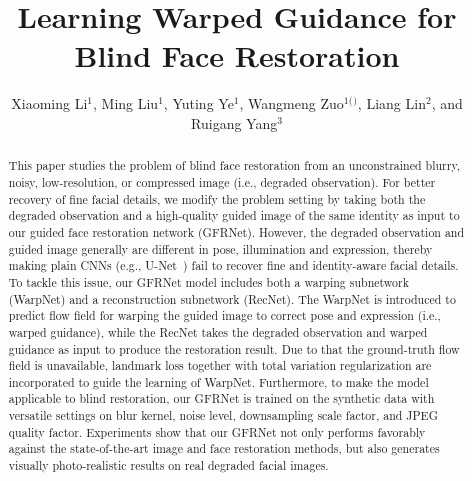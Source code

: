 \documentclass[runningheads]{llncs}
\begin{document}
\pagestyle{headings}
\mainmatter
\def\ECCV18SubNumber{399}  

\title{Learning Warped Guidance for Blind Face Restoration} 

\titlerunning{}

\author{Xiaoming Li$^1$, Ming Liu$^1$, Yuting Ye$^1$, Wangmeng Zuo$^{1(}$\Envelope$^)$, Liang Lin$^2$, \newline and Ruigang Yang$^3$}
\maketitle
\begin{abstract}
This paper studies the problem of blind face restoration from an unconstrained blurry, noisy, low-resolution, or compressed image (i.e., degraded observation).
For better recovery of fine facial details, we modify the problem setting by taking both the degraded observation and a high-quality guided image of the same identity as input to our guided face restoration network (GFRNet).
However, the degraded observation and guided image generally are different in pose, illumination and expression, thereby making plain CNNs (e.g., U-Net~\cite{ronneberger2015u}) fail to recover fine and identity-aware facial details.
To tackle this issue, our GFRNet model includes both a warping subnetwork (WarpNet) and a reconstruction subnetwork (RecNet).
The WarpNet is introduced to predict flow field for warping the guided image to correct pose and expression (i.e., warped guidance),
while the RecNet takes the degraded observation and warped guidance as input to produce the restoration result.
Due to that the ground-truth flow field is unavailable, landmark loss together with total variation regularization are incorporated to guide the learning of WarpNet.
Furthermore, to make the model applicable to blind restoration, our GFRNet is trained on the synthetic data with versatile settings on blur kernel, noise level, downsampling scale factor, and JPEG quality factor.
Experiments show that our GFRNet not only performs favorably against the state-of-the-art image and face restoration methods, but also generates visually photo-realistic results on real degraded facial images.

\end{abstract}
\end{document}
